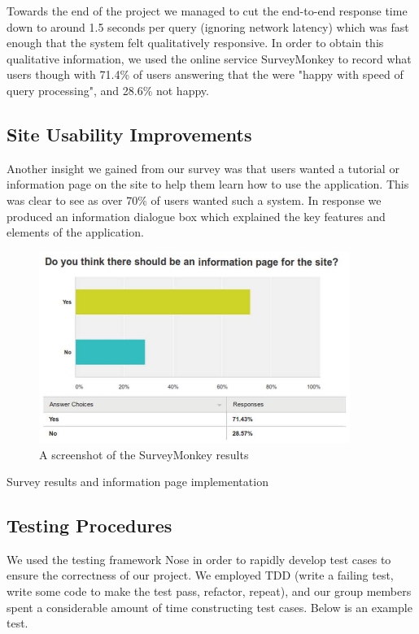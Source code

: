 \documentclass[a4paper, 11pt]{article}
\begin{document}
    Towards the  end of the project we managed to cut the end-to-end response time 
    down to  around 1.5 seconds per query (ignoring network latency) which was 
    fast enough that the system felt qualitatively responsive. In order to obtain 
    this qualitative information, we used the online service SurveyMonkey to record 
    what users though with 71.4\% of users answering that the were "happy with speed
    of query processing", and 28.6\% not happy. 

    \subsection{Site Usability Improvements}
    Another insight we gained from our survey was that users wanted a tutorial
    or information page on the site to help them learn how to use the
    application. This was clear to see as over 70\% of users wanted such a
    system. In response we produced an information dialogue box which explained
    the key features and elements of the application.

    \begin{figure}
      \centering
      \includegraphics[width=0.9\textwidth]{images/survey.jpg}
      \caption{A screenshot of the SurveyMonkey results} 
    \end{figure}
    Survey results and information page implementation   
    \subsection{Testing Procedures}
    We used the testing framework Nose in order to rapidly develop test cases to
    ensure the correctness of our project. We employed TDD (write a failing
    test, write some code to make the test pass, refactor, repeat), and our group 
    members spent a considerable amount of time constructing test cases. Below is an 
    example test.
\end{document}
